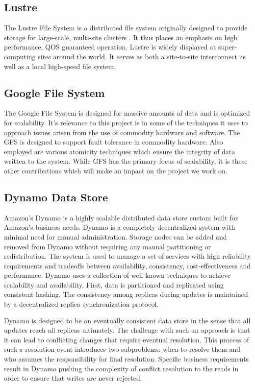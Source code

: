 \documentclass[11pt]{article}
\begin{document}
\subsection{Lustre}
The Lustre File System is a distributed file system originally designed
to provide storage for large-scale, multi-site clusters
\cite{Braam:LustreWhite}. It thus
places an emphasis on high performance, QOS guaranteed
operation. Lustre is widely displayed at super-computing sites around
the world. It serves as both a site-to-site interconnect as well as a
local high-speed file system.

\subsection{Google File System}
The Google File System is designed for massive amounts of data and is 
optimized for scalability. It's relevance to this project is in some 
of the techniques it uses to approach issues arisen from the use of 
commodity hardware and software. The GFS is designed to support fault
tolerance in commodity hardware. Also employed are various atomicity
techniques which ensure the integrity of data written to the system.
While GFS has the primary focus of scalability, it is these other 
contributions which will make an impact on the project we work on.

\subsection{Dynamo Data Store}
Amazon's Dynamo is a highly scalable distributed data store custom
built for Amazon’s business needs. Dynamo is a completely
decentralized system with minimal need for manual administration. 
Storage nodes can be added and removed from Dynamo without requiring 
any manual partitioning or redistribution. The system is used to manage 
a set of services with high reliability requirements and tradeoffs 
between availability, consistency, cost-effectiveness and performance. 
Dynamo uses a collection of well known techniques to achieve scalability 
and availability. First, data is partitioned and replicated using 
consistent hashing. The consistency among replicas during updates is 
maintained by a decentralized replica synchronization protocol.

Dynamo is designed to be an eventually consistent data store in the
sense that all updates reach all replicas ultimately. The challenge
with such an approach is that it can lead to conflicting changes that
require eventual resolution. This process of such a resolution event
introduces two subproblems: when to resolve them and who assumes the
responsibility for final resolution. Specific business requirements
result in Dynamo pushing the complexity of conflict resolution to the
reads in order to ensure that writes are never rejected.
\end{document}
